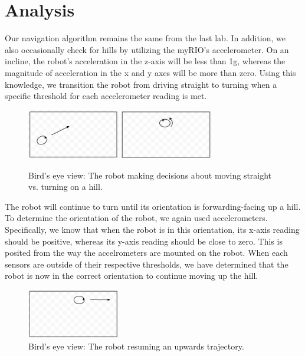 \documentclass[10pt,titlepage]{article}
\begin{document}
  \section{Analysis}
    Our navigation algorithm remains the same from the last lab. In addition, we also occasionally check for hills by utilizing the myRIO's accelerometer. On an incline, the robot's acceleration in the z-axis will be less than 1g, whereas the magnitude of acceleration in the x and y axes will be more than zero. Using this knowledge, we transition the robot from driving straight to turning when a specific threshold for each accelerometer reading is met. \\ 
    \begin{figure}[H]
        \centering
        \includegraphics[keepaspectratio,width=0.36\textwidth]{../lab5_data/move.png}
        \includegraphics[keepaspectratio,width=0.36\textwidth]{../lab5_data/turn.png}
        \caption{Bird's eye view: The robot making decisions about moving straight vs. turning on a hill.}
    \end{figure}
    The robot will continue to turn until its orientation is forwarding-facing up a hill. To determine the orientation of the robot, we again used accelerometers. Specifically, we know that when the robot is in this orientation, its x-axis reading should be positive, whereas its y-axis reading should be close to zero. This is posited from the way the accelrometers are mounted on the robot. When each sensors are outside of their respective thresholds, we have determined that the robot is now in the correct orientation to continue moving up the hill. \\ 
    \begin{figure}[H]
        \centering
        \includegraphics[keepaspectratio,width=0.36\textwidth]{../lab5_data/continue.png}
        \caption{Bird's eye view: The robot resuming an upwards trajectory.}
    \end{figure}
\end{document}
